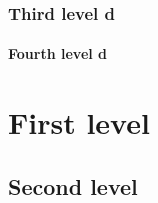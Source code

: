 \section{Third level d}
\label{thirdleveld}

\subsection{Fourth level d}
\label{fourthleveld}

\tableofcontents

\part{First level}
\label{firstlevele}

\chapter{Second level}
\label{secondlevele}



